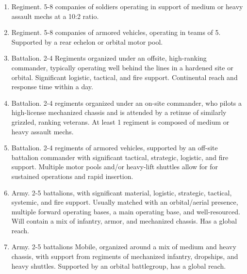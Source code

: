 \begin{enumerate}
    \item Regiment. 5-8 companies of soldiers operating in support of medium or heavy assault mechs at a 10:2 ratio.
    \item Regiment. 5-8 companies of armored vehicles, operating in teams of 5. Supported by a rear echelon or orbital motor pool.
    \item Battalion. 2-4 Regiments organized under an offsite, high-ranking commander, typically operating well behind the lines in a hardened site or orbital. Significant logistic, tactical, and fire support. Continental reach and response time within a day.
    \item Battalion. 2-4 regiments organized under an on-site commander, who pilots a high-license mechanized chassis and is attended by a retinue of similarly grizzled, ranking veterans. At least 1 regiment is composed of medium or heavy assault mechs.
    \item Battalion. 2-4 regiments of armored vehicles, supported by an off-site battalion commander with significant tactical, strategic, logistic, and fire support. Multiple motor pools and/or heavy-lift shuttles allow for for sustained operations and rapid insertion.
    \item Army. 2-5 battalions, with significant material, logistic, strategic, tactical, systemic, and fire support. Usually matched with an orbital/aerial presence, multiple forward operating bases, a main operating base, and well-resourced. Will contain a mix of infantry, armor, and mechanized chassis. Has a global reach.
    \item Army. 2-5 battalions Mobile, organized around a mix of medium and heavy chassis, with support from regiments of mechanized infantry, dropships, and heavy shuttles. Supported by an orbital battlegroup, has a global reach.
\end{enumerate}